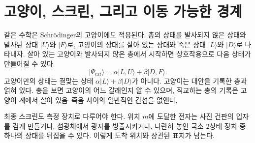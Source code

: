 \begin{classroomqa}
\end{classroomqa}

\section{고양이, 스크린, 그리고 이동 가능한 경계}

같은 수학은 Schr\"odinger의 고양이에도 적용된다. 총의 상태를 발사되지 않은 상태와 발사된 상태 \(|U\rangle\)와 \(|F\rangle\)로, 고양이의 상태를 살아 있는 상태와 죽은 상태 \(|L\rangle\)와 \(|D\rangle\)로 나타내자. 살아 있는 고양이와 발사되지 않은 총에서 시작하면 상호작용으로 다음 상태가 만들어질 수 있다.
\begin{equation}
|\Psi_{\mathrm{cat}}\rangle
=\alpha|L,U\rangle+\beta|D,F\rangle.
\end{equation}
고양이만의 상태는 결맞는 상태 \(\alpha|L\rangle+\beta|D\rangle\)가 아니다. 고양이는 대안을 기록한 총과 얽혀 있다. 총을 보면 고양이의 어느 갈래인지 알 수 있으며, 직교하는 총의 기록은 고양이 계에서 살아 있음--죽음 사이의 일반적인 간섭을 없앤다.

\begin{classroomqa}
\end{classroomqa}

최종 스크린도 측정 장치로 다루어야 한다. 위치 \(m\)에 도달한 전자는 사진 건판의 입자를 검게 만들거나, 섬광체에서 광자를 방출시키거나, 나란히 놓인 국소 2상태 장치 중 하나의 상태를 뒤집을 수 있다. 이렇게 도착 위치와 상관된 표지가 남는다.

\begin{classroomqa}
\end{classroomqa}

